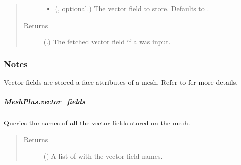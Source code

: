 \documentclass[letterpaper,10pt,english]{sphinxmanual}
\begin{document}
\begin{fulllineitems}
\begin{fulllineitems}
\begin{quote}
\begin{description}
\begin{itemize}
\item {} 
 (, optional.) \textendash{} The vector field to store. Defaults to .

\end{itemize}

\item[{Returns}] \leavevmode
{} (.) \textendash{} The fetched vector field if a  was input.

\end{description}\end{quote}
\subsubsection*{Notes}

Vector fields are stored a face attributes of a mesh.
Refer to  for more details.

\end{fulllineitems}



\subparagraph{MeshPlus.vector\_fields}
\label{\detokenize{api/generated/directional_clustering.mesh.MeshPlus.vector_fields:meshplus-vector-fields}}\label{\detokenize{api/generated/directional_clustering.mesh.MeshPlus.vector_fields::doc}}

\begin{fulllineitems}
\label{\detokenize{api/generated/directional_clustering.mesh.MeshPlus.vector_fields:directional_clustering.mesh.MeshPlus.vector_fields}}
Queries the names of all the vector fields stored on the mesh.
\begin{quote}\begin{description}
\item[{Returns}] \leavevmode
{} () \textendash{} A list of with the vector field names.

\end{description}\end{quote}


\end{fulllineitems}
\end{fulllineitems}
\end{document}
